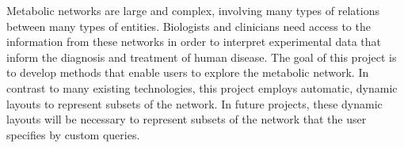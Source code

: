 

Metabolic networks are large and complex, involving many types of relations between many types of entities.
Biologists and clinicians need access to the information from these networks in order to interpret experimental data that inform the diagnosis and treatment of human disease.
The goal of this project is to develop methods that enable users to explore the metabolic network.
In contrast to many existing technologies, this project employs automatic, dynamic layouts to represent subsets of the network.
In future projects, these dynamic layouts will be necessary to represent subsets of the network that the user specifies by custom queries.
